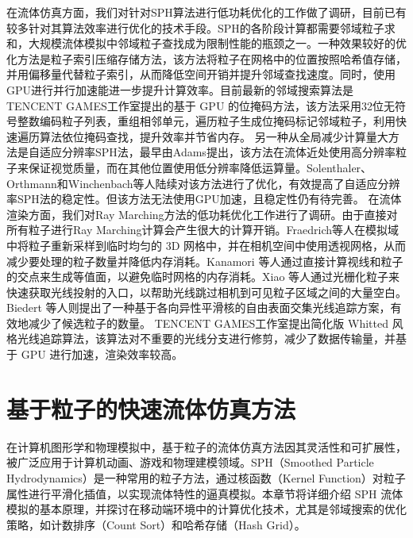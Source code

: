\indent 在流体仿真方面，我们对针对SPH算法进行低功耗优化的工作做了调研，目前已有较多针对其算法效率进行优化的技术手段。SPH的各阶段计算都需要邻域粒子求和，大规模流体模拟中邻域粒子查找成为限制性能的瓶颈之一。一种效果较好的优化方法是粒子索引压缩存储方法\cite{band2020compressed, horvath2012real, winchenbach2020multi}，该方法将粒子在网格中的位置按照哈希值存储，并用偏移量代替粒子索引，从而降低空间开销并提升邻域查找速度。同时，使用GPU进行并行加速能进一步提升计算效率。目前最新的邻域搜索算法是TENCENT GAMES工作室\cite{liu2023building}提出的基于 GPU 的位掩码方法，该方法采用32位无符号整数编码粒子列表，重组相邻单元，遍历粒子生成位掩码标记邻域粒子，利用快速遍历算法依位掩码查找，提升效率并节省内存。
\newline
\indent 另一种从全局减少计算量大方法是自适应分辨率SPH法，最早由Adams\cite{adams2007adaptively}提出，该方法在流体近处使用高分辨率粒子来保证视觉质量，而在其他位置使用低分辨率降低运算量。Solenthaler\cite{solenthaler2011two}、Orthmann\cite{orthmann2012temporal}和Winchenbach\cite{winchenbach2021optimized}等人陆续对该方法进行了优化，有效提高了自适应分辨率SPH法的稳定性。但该方法无法使用GPU加速，且稳定性仍有待完善。
\newline
\indent
在流体渲染方面，我们对Ray Marching方法的低功耗优化工作进行了调研。由于直接对所有粒子进行Ray Marching计算会产生很大的计算开销。Fraedrich等人\cite{fraedrich2010efficient}在模拟域中将粒子重新采样到临时均匀的 3D 网格中，并在相机空间中使用透视网格，从而减少要处理的粒子数量并降低内存消耗。Kanamori 等人\cite{kanamori2008gpu}通过直接计算视线和粒子的交点来生成等值面，以避免临时网格的内存消耗。Xiao 等人\cite{xiao2017real}通过光栅化粒子来快速获取光线投射的入口，以帮助光线跳过相机到可见粒子区域之间的大量空白。Biedert 等人\cite{biedert2018direct}则提出了一种基于各向异性平滑核的自由表面交集光线追踪方案，有效地减少了候选粒子的数量。
TENCENT GAMES工作室\cite{liu2023building}提出简化版 Whitted 风格光线追踪算法，该算法对不重要的光线分支进行修剪，减少了数据传输量，并基于 GPU 进行加速，渲染效率较高。

% 

\chapter{基于粒子的快速流体仿真方法}

在计算机图形学和物理模拟中，基于粒子的流体仿真方法因其灵活性和可扩展性，被广泛应用于计算机动画、游戏和物理建模领域。SPH（Smoothed Particle Hydrodynamics）是一种常用的粒子方法，通过核函数（Kernel Function）对粒子属性进行平滑化插值，以实现流体特性的逼真模拟。本章节将详细介绍 SPH 流体模拟的基本原理，并探讨在移动端环境中的计算优化技术，尤其是邻域搜索的优化策略，如计数排序（Count Sort）和哈希存储（Hash Grid）。

